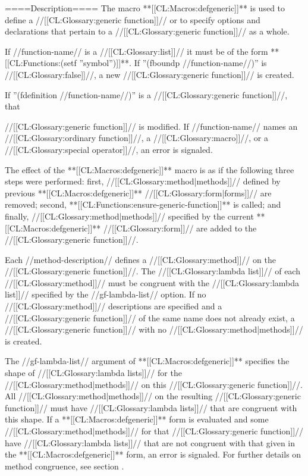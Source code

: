 ====Description====
The macro **[[CL:Macros:defgeneric]]** is used to define a //[[CL:Glossary:generic function]]// or to specify options and declarations that pertain to a //[[CL:Glossary:generic function]]// as a whole.

If //function-name// is a //[[CL:Glossary:list]]// it must be of the form **[[CL:Functions:(setf ''symbol'')]]**. If ''(fboundp //function-name//)'' is //[[CL:Glossary:false]]//, a new //[[CL:Glossary:generic function]]// is created.

If ''(fdefinition //function-name//)'' is a //[[CL:Glossary:generic function]]//, that

//[[CL:Glossary:generic function]]// is modified. If //function-name// names an //[[CL:Glossary:ordinary function]]//, a //[[CL:Glossary:macro]]//, or a //[[CL:Glossary:special operator]]//, an error is signaled.

The effect of the **[[CL:Macros:defgeneric]]** macro is as if the following three steps were performed: first, //[[CL:Glossary:method|methods]]// defined by previous **[[CL:Macros:defgeneric]]** //[[CL:Glossary:form|forms]]// are removed;  second, **[[CL:Functions:ensure-generic-function]]** is called; and finally, //[[CL:Glossary:method|methods]]// specified by the current **[[CL:Macros:defgeneric]]** //[[CL:Glossary:form]]// are added to the //[[CL:Glossary:generic function]]//.

Each //method-description// defines a //[[CL:Glossary:method]]// on the //[[CL:Glossary:generic function]]//. The //[[CL:Glossary:lambda list]]// of each //[[CL:Glossary:method]]// must be congruent with the //[[CL:Glossary:lambda list]]// specified by the //gf-lambda-list// option. If no //[[CL:Glossary:method]]// descriptions are specified and a //[[CL:Glossary:generic function]]// of the same name does not already exist, a //[[CL:Glossary:generic function]]// with no //[[CL:Glossary:method|methods]]// is created.

The //gf-lambda-list// argument of **[[CL:Macros:defgeneric]]** specifies the shape of //[[CL:Glossary:lambda lists]]// for the //[[CL:Glossary:method|methods]]// on this //[[CL:Glossary:generic function]]//. All //[[CL:Glossary:method|methods]]// on the resulting //[[CL:Glossary:generic function]]// must have //[[CL:Glossary:lambda lists]]// that are congruent with this shape. If a **[[CL:Macros:defgeneric]]** form is evaluated and some //[[CL:Glossary:method|methods]]// for that //[[CL:Glossary:generic function]]// have //[[CL:Glossary:lambda lists]]// that are not congruent with that given in the **[[CL:Macros:defgeneric]]** form, an error is signaled. For further details on method congruence, see section {\secref\GFMethodLambdaListCongruency}.

